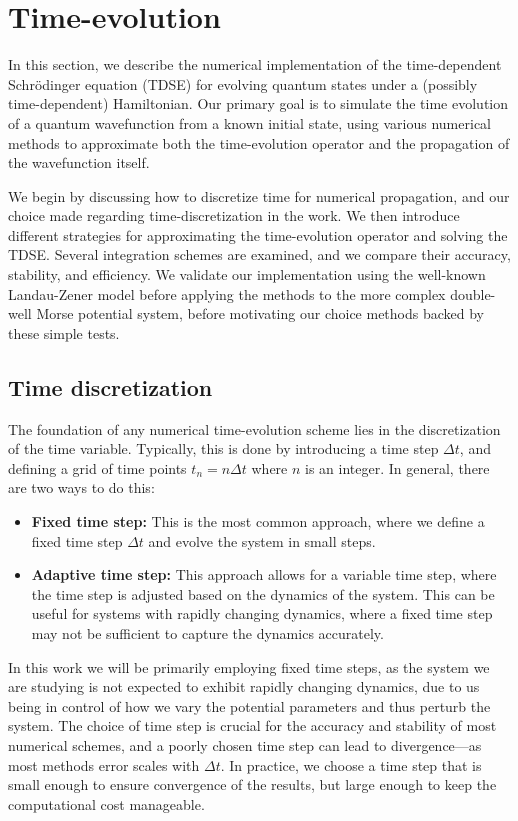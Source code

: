 \documentclass{subfiles}
\begin{document}
\section{Time-evolution}\label{sec:time_evolve_methods}
In this section, we describe the numerical implementation of the time-dependent Schrödinger equation (TDSE) for evolving quantum states under a (possibly time-dependent) Hamiltonian. Our primary goal is to simulate the time evolution of a quantum wavefunction from a known initial state, using various numerical methods to approximate both the time-evolution operator and the propagation of the wavefunction itself.

We begin by discussing how to discretize time for numerical propagation, and our choice made regarding time-discretization in the work. We then introduce different strategies for approximating the time-evolution operator and solving the TDSE. Several integration schemes are examined, and we compare their accuracy, stability, and efficiency. We validate our implementation using the well-known Landau-Zener model before applying the methods to the more complex double-well Morse potential system, before motivating our choice methods backed by these simple tests.

\subsection{Time discretization}
The foundation of any numerical time-evolution scheme lies in the discretization of the time variable. Typically, this is done by introducing a time step $\Delta t$, and defining a grid of time points $t_n = n \Delta t$ where $n$ is an integer. In general, there are two ways to do this:
\begin{itemize}
    \item \textbf{Fixed time step:} This is the most common approach, where we define a fixed time step $\Delta t$ and evolve the system in small steps. 
    \item \textbf{Adaptive time step:} This approach allows for a variable time step, where the time step is adjusted based on the dynamics of the system. This can be useful for systems with rapidly changing dynamics, where a fixed time step may not be sufficient to capture the dynamics accurately.
\end{itemize}
In this work we will be primarily employing fixed time steps, as the system we are studying is not expected to exhibit rapidly changing dynamics, due to us being in control of how we vary the potential parameters and thus perturb the system. The choice of time step is crucial for the accuracy and stability of most numerical schemes, and a poorly chosen time step can lead to divergence—as most methods error scales with $\Delta t$. In practice, we choose a time step that is small enough to ensure convergence of the results, but large enough to keep the computational cost manageable. 
\end{document}
